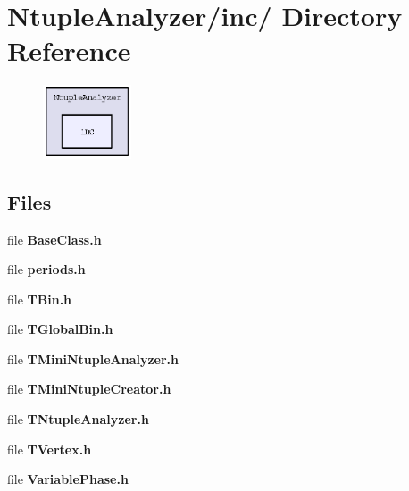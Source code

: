 \section{Ntuple\-Analyzer/inc/ Directory Reference}
\label{dir_34f75e9268766a6892609710d2e15651}


\begin{figure}[H]
\begin{center}
\leavevmode
\includegraphics[width=74pt]{dir_34f75e9268766a6892609710d2e15651_dep}
\end{center}
\end{figure}
\subsection*{Files}
\begin{CompactItemize}
\item 
file \textbf{Base\-Class.h}
\item 
file \textbf{periods.h}
\item 
file \textbf{TBin.h}
\item 
file \textbf{TGlobal\-Bin.h}
\item 
file \textbf{TMini\-Ntuple\-Analyzer.h}
\item 
file \textbf{TMini\-Ntuple\-Creator.h}
\item 
file \textbf{TNtuple\-Analyzer.h}
\item 
file \textbf{TVertex.h}
\item 
file \textbf{Variable\-Phase.h}
\end{CompactItemize}
